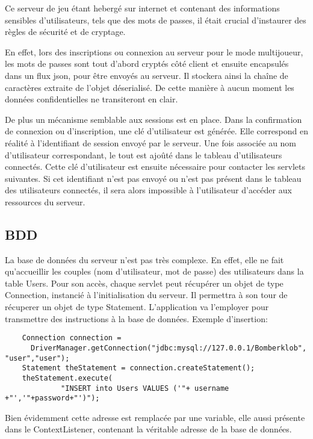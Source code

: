 		Ce serveur de jeu étant hebergé sur internet et contenant des informations
		sensibles d'utilisateurs, tels que des mots de passes, il était crucial
		d'instaurer des règles de sécurité et de cryptage. 
		
		En effet, lors des inscriptions ou connexion au serveur pour le mode
		multijoueur, les mots de passes sont tout d'abord cryptés côté client et
		ensuite encapsulés dans un flux \gls{json}, pour être envoyés au serveur. Il
		stockera ainsi la chaîne de caractères extraite de l'objet déserialisé. De cette
		manière à aucun moment les données confidentielles ne transiteront en clair.
		
		De plus un mécanisme semblable aux sessions est en place. Dans la
		confirmation de connexion ou d'inscription, une clé d'utilisateur est générée. Elle correspond en
		réalité à l'identifiant de session envoyé par le serveur. Une fois associée
		au nom d'utilisateur correspondant, le tout est ajoûté dans le tableau
		d'utilisateurs connectés.
		Cette clé d'utilisateur est ensuite nécessaire pour contacter les \glspl{servlet}
		suivantes. Si cet identifiant n'est pas envoyé ou n'est pas présent dans le tableau des
		utilisateurs connectés, il sera alors impossible à l'utilisateur d'accéder aux
		ressources du serveur.
		
\subsection{BDD}

	La base de données du serveur n'est pas très complexe. En effet, elle ne fait
	qu'accueillir les couples (nom d'utilisateur, mot de passe) des utilisateurs dans
	la table Users. 
	Pour son accès, chaque \gls{servlet} peut récupérer un objet de type
	Connection, instancié à l'initialisation du serveur. Il permettra à son tour
	de récuperer un objet de type Statement. L'application va l'employer pour
	transmettre des instructions à la base de données.
	Exemple d'insertion: 
		
	\begin{verbatim}
	Connection connection = 
	  DriverManager.getConnection("jdbc:mysql://127.0.0.1/Bomberklob", "user","user");
	Statement theStatement = connection.createStatement();
	theStatement.execute(
		     "INSERT into Users VALUES ('"+ username +"','"+password+"')");
	\end{verbatim}
	
	Bien évidemment cette adresse est remplacée par une variable, elle aussi
	présente dans le ContextListener, contenant la véritable adresse de la base de
	données.
	
	
	
	
